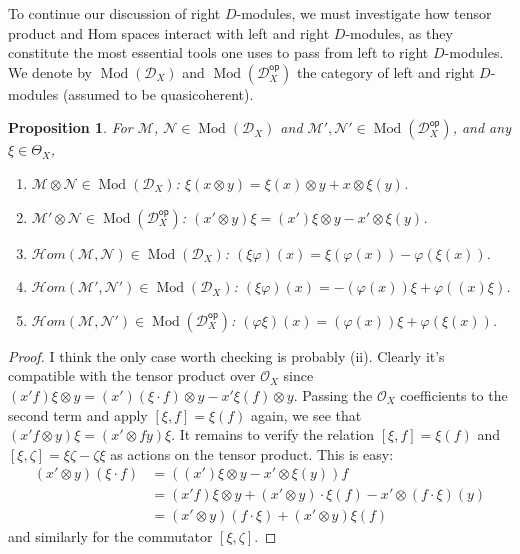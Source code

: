 \documentclass[11pt, a4paper]{article}
\newtheorem{proposition}[theorem]{Proposition}
\theoremstyle{definition}
\newcommand{\op}[0]{\mathsf{op}}
\newcommand{\Mod}{\operatorname{Mod}}
\begin{document}
    To continue our discussion of right $D$-modules, we must investigate how tensor product and Hom spaces interact with left and right $D$-modules, as they constitute the most essential tools one uses to pass from left to right $D$-modules. We denote by $\Mod(\mathcal D_X)$ and $\Mod(\mathcal D_X^\op)$ the category of left and right $D$-modules (assumed to be quasicoherent).
    \begin{proposition}
        For $\mathcal M$, $\mathcal N\in\Mod(\mathcal D_X)$ and $\mathcal M', \mathcal N'\in \Mod(\mathcal D_X^\op)$, and any $\xi\in\Theta_X$,
        \begin{enumerate}[\normalfont(i)]
            \item $\mathcal M\otimes\mathcal N\in\Mod(\mathcal D_X)$: $\xi(x\otimes y)=\xi(x)\otimes y+x\otimes\xi(y)$.
            \item $\mathcal M'\otimes\mathcal N\in\Mod(\mathcal D_X^\op)$: $(x'\otimes y)\xi=(x')\xi\otimes y-x'\otimes \xi(y)$.
            \item $\mathcal Hom(\mathcal M,\mathcal N)\in\Mod(\mathcal D_X)$: $(\xi\varphi)(x)=\xi(\varphi(x))-\varphi(\xi(x))$.
            \item $\mathcal Hom(\mathcal M',\mathcal N')\in\Mod(\mathcal D_X)$: $(\xi\varphi)(x)=-(\varphi(x))\xi+\varphi((x)\xi)$.
            \item $\mathcal Hom(\mathcal M,\mathcal N')\in\Mod(\mathcal D_X^\op)$: $(\varphi\xi)(x)=(\varphi(x))\xi+\varphi(\xi(x))$.
        \end{enumerate}
    \end{proposition}
    \begin{proof}
        I think the only case worth checking is probably (ii). Clearly it's compatible with the tensor product over $\mathcal O_X$ since $(x'f)\xi\otimes y=(x')(\xi\cdot f)\otimes y-x'\xi(f)\otimes y$. Passing the $\mathcal O_X$ coefficients to the second term and apply $[\xi, f]=\xi(f)$ again, we see that $(x'f\otimes y)\xi=(x'\otimes fy)\xi$. It remains to verify the relation $[\xi, f]=\xi(f)$ and $[\xi,\zeta]=\xi\zeta-\zeta\xi$ as actions on the tensor product. This is easy:
        \begin{align*}
            (x'\otimes y)(\xi\cdot f)&=((x')\xi\otimes y-x'\otimes\xi(y))f\\
            &=(x'f)\xi\otimes y+(x'\otimes y)\cdot\xi(f)-x'\otimes (f\cdot\xi)(y)\\
            &=(x'\otimes y)(f\cdot \xi)+(x'\otimes y)\xi(f)
        \end{align*}
        and similarly for the commutator $[\xi,\zeta]$.
    \end{proof}
\end{document}
